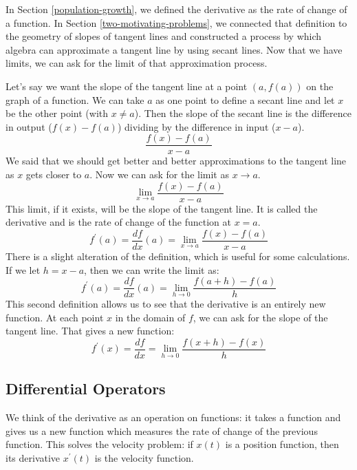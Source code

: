 \documentclass[fleqn]{report}
\begin{document}
In Section \ref{population-growth}, we defined the derivative as the
rate of change of a function. In Section
\ref{two-motivating-problems}, we connected that definition to the
geometry of slopes of tangent lines and constructed a process by which
algebra can approximate a tangent line by using secant lines. Now that
we have limits, we can ask for the limit of that approximation
process.

Let's say we want the slope of the tangent line at a point
$(a,f(a))$ on the graph of a function. We can take $a$ as
one point to define a secant line and let $x$ be the other
point (with $x \neq a$). Then the slope of the secant line is
the difference in output ($f(x) - f(a)$) dividing by the
difference in input ($x-a$). 
\begin{equation*}
\frac{f(x) - f(a)}{x-a}
\end{equation*}
We said that we should get better and better approximations to
the tangent line as $x$ gets closer to $a$. Now we can ask
for the limit as $x \rightarrow a$.
\begin{equation*}
\lim_{x \rightarrow a} \frac{f(x) - f(a)}{x-a}
\end{equation*}
This limit, if it exists, will be the slope of the tangent
line. It is called the derivative and is the rate of change
of the function at $x=a$.
\begin{equation*}
f^\prime(a) = \frac{df}{dx} (a) = \lim_{x \rightarrow a}
\frac{f(x) - f(a)}{x-a} 
\end{equation*}
There is a slight alteration of the definition, which is
useful for some calculations. If we let $h = x-a$, then we can
write the limit as:
\begin{equation*}
f^\prime(a) = \frac{df}{dx} (a) = \lim_{h \rightarrow 0}
\frac{f(a+h) - f(a)}{h} 
\end{equation*}
This second definition allows us to see that the derivative is
an entirely new function. At each point $x$ in the
domain of $f$, we can ask for the slope of the tangent line.
That gives a new function:
\begin{equation*}
f^\prime(x) = \frac{df}{dx} = \lim_{h \rightarrow 0}
\frac{f(x+h) - f(x)}{h} 
\end{equation*}

\subsection{Differential Operators}
\label{operators}

We think of the derivative as an operation on functions: it
takes a function and gives us a new function which measures
the rate of change of the previous function. This solves the
velocity problem: if $x(t)$ is a position function, then its
derivative $x^\prime(t)$ is the velocity function. 
\end{document}
